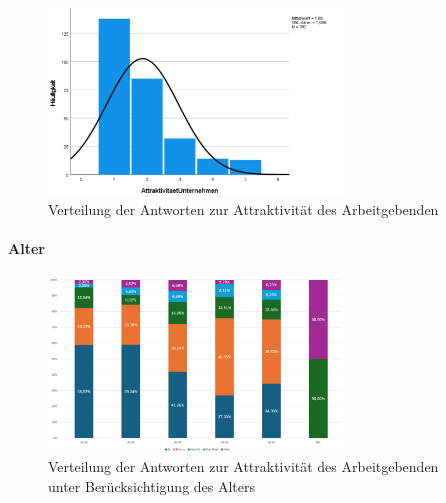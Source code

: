 \begin{figure}[h]
    \centering
    \includegraphics[width=0.7\textwidth]{04_Artefakte/01_Abbildungen/hypothese_5/attraktivitaet_histogram.png}
    \caption{Verteilung der Antworten zur Attraktivität des Arbeitgebenden}
    \label{fig:attraktivitaet_verteilung}
\end{figure}

\paragraph*{Alter}




\begin{figure}
  \centering
  \includegraphics[width=0.7\textwidth]{04_Artefakte/01_Abbildungen/hypothese_5/attraktivitaet_alter.png}
  \caption{Verteilung der Antworten zur Attraktivität des Arbeitgebenden unter Berücksichtigung des Alters}
  \label{fig:attraktivitaet_alter}
\end{figure}

